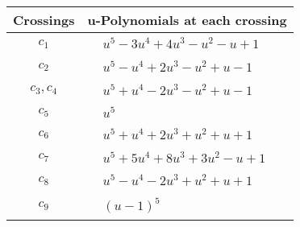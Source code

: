 \documentclass[1p]{elsarticle_modified}
\theoremstyle{definition}
\begin{document}
\begin{tabular}{m{50pt}|m{274pt}}
Crossings & \hspace{64pt}u-Polynomials at each crossing \\
\hline $$\begin{aligned}c_{1}\end{aligned}$$&$\begin{aligned}
&u^5-3 u^4+4 u^3- u^2- u+1
\end{aligned}$\\
\hline $$\begin{aligned}c_{2}\end{aligned}$$&$\begin{aligned}
&u^5- u^4+2 u^3- u^2+u-1
\end{aligned}$\\
\hline $$\begin{aligned}c_{3},c_{4}\end{aligned}$$&$\begin{aligned}
&u^5+u^4-2 u^3- u^2+u-1
\end{aligned}$\\
\hline $$\begin{aligned}c_{5}\end{aligned}$$&$\begin{aligned}
&u^5
\end{aligned}$\\
\hline $$\begin{aligned}c_{6}\end{aligned}$$&$\begin{aligned}
&u^5+u^4+2 u^3+u^2+u+1
\end{aligned}$\\
\hline $$\begin{aligned}c_{7}\end{aligned}$$&$\begin{aligned}
&u^5+5 u^4+8 u^3+3 u^2- u+1
\end{aligned}$\\
\hline $$\begin{aligned}c_{8}\end{aligned}$$&$\begin{aligned}
&u^5- u^4-2 u^3+u^2+u+1
\end{aligned}$\\
\hline $$\begin{aligned}c_{9}\end{aligned}$$&$\begin{aligned}
&(u-1)^5
\end{aligned}$\\

\end{tabular}
\end{document}
